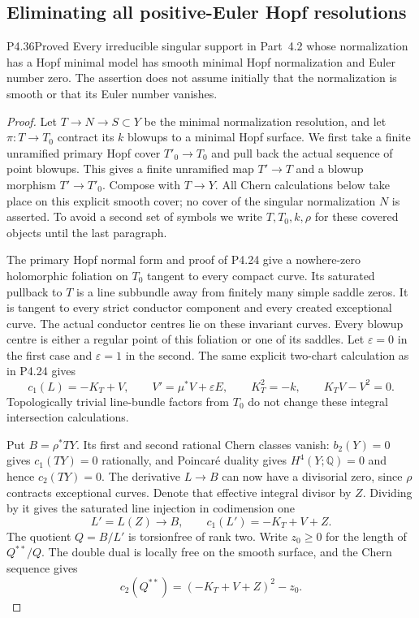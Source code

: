 \subsection{Eliminating all positive-Euler Hopf resolutions}

\begin{statement}{P4.36}{Proved}
Every irreducible singular support in Part~4.2 whose
normalization has a Hopf minimal model has smooth minimal
Hopf normalization and Euler number zero. The assertion
does not assume initially that the normalization is smooth
or that its Euler number vanishes.
\end{statement}
\begin{proof}
Let $T\to N\to S\subset Y$ be the minimal normalization
resolution, and let $\pi:T\to T_0$ contract its $k$ blowups
to a minimal Hopf surface. We first take a finite unramified
primary Hopf cover $T'_0\to T_0$ and pull back the actual
sequence of point blowups. This gives a finite unramified
map $T'\to T$ and a blowup morphism $T'\to T'_0$.
Compose with $T\to Y$. All Chern calculations below take
place on this explicit smooth cover; no cover of the
singular normalization $N$ is asserted. To avoid a second
set of symbols we write $T,T_0,k,\rho$ for these covered
objects until the last paragraph.

The primary Hopf normal form and proof of P4.24 give a
nowhere-zero holomorphic foliation on $T_0$ tangent to
every compact curve. Its saturated pullback to $T$ is a
line subbundle away from finitely many simple saddle
zeros. It is tangent to every strict conductor component
and every created exceptional curve. The actual conductor
centres lie on these invariant curves. Every blowup centre
is either a regular point of this foliation or one of its
saddles. Let $\varepsilon=0$ in the first case and
$\varepsilon=1$ in the second. The same explicit two-chart
calculation as in P4.24 gives
\[
 c_1(L)=-K_T+V,\qquad
 V'=\mu^*V+\varepsilon E,
 \qquad K_T^2=-k,\qquad K_TV-V^2=0.
\]
Topologically trivial line-bundle factors from $T_0$ do
not change these integral intersection calculations.

Put $B=\rho^*TY$. Its first and second rational Chern
classes vanish: $b_2(Y)=0$ gives $c_1(TY)=0$ rationally,
and Poincar\'e duality gives $H^4(Y;\mathbb Q)=0$ and
hence $c_2(TY)=0$. The derivative $L\to B$ can now have
a divisorial zero, since $\rho$ contracts exceptional
curves. Denote that effective integral divisor by $Z$.
Dividing by it gives the saturated line injection in
codimension one
\[
 L'=L(Z)\longrightarrow B,
 \qquad c_1(L')=-K_T+V+Z.
\]
The quotient $Q=B/L'$ is torsionfree of rank two.
Write $z_0\ge0$ for the length of $Q^{**}/Q$.
The double dual is locally free on the smooth surface,
and the Chern sequence gives
\[
 c_2(Q^{**})=(-K_T+V+Z)^2-z_0.
\]


\end{proof}
